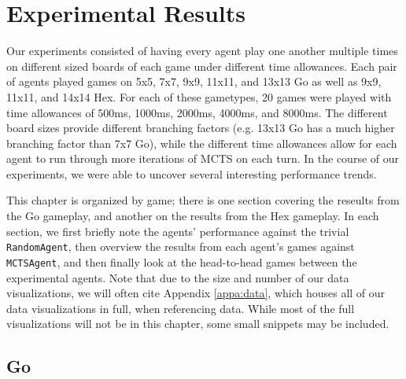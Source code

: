 %
%
%
\chapter{Experimental Results}\label{ch:implem}
Our experiments consisted of having every agent play one another multiple times on different sized boards of each game under different time allowances.  Each pair of agents played games on 5x5, 7x7, 9x9, 11x11, and 13x13 Go as well as 9x9, 11x11, and 14x14 Hex.  For each of these gametypes, 20 games were played with time allowances of 500ms, 1000ms, 2000ms, 4000ms, and 8000ms.  The different board sizes provide different branching factors (e.g. 13x13 Go has a much higher branching factor than 7x7 Go), while the different time allowances allow for each agent to run through more iterations of MCTS on each turn.  In the course of our experiments, we were able to uncover several interesting performance trends.

This chapter is organized by game; there is one section covering the reseults from the Go gameplay, and another on the results from the Hex gameplay.  In each section, we first briefly note the agents' performance against the trivial \texttt{RandomAgent}, then overview the results from each agent's games against \texttt{MCTSAgent}, and then finally look at the head-to-head games between the experimental agents.  Note that due to the size and number of our data visualizations, we will often cite Appendix \ref{appa:data}, which houses all of our data visualizations in full, when referencing data.  While most of the full visualizations will not be in this chapter, some small snippets may be included.

\section{Go}